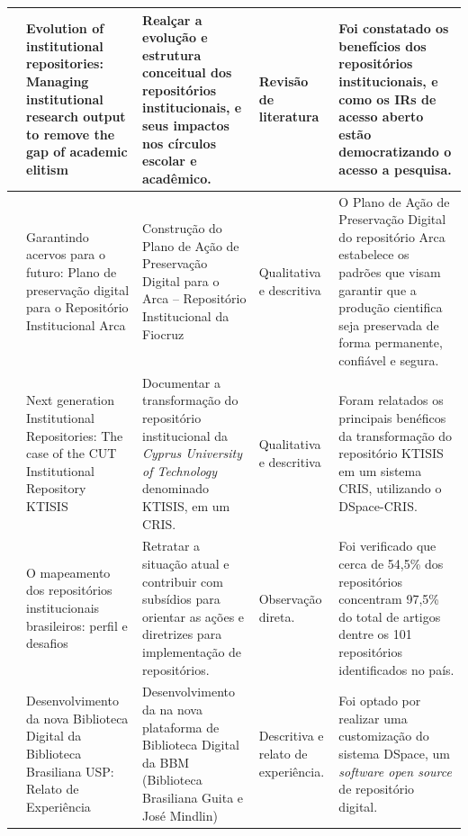 \begin{landscape}
\begin{table}[H]
{\begin{tabular}{|p{5cm}|p{12cm}|p{12cm}|p{4cm}|p{13cm}|}
                \cite{2021:Bashir}           & Evolution of institutional repositories: Managing institutional research output to remove the gap of academic elitism                     & Realçar a evolução e estrutura conceitual dos repositórios institucionais, e seus impactos nos círculos escolar e acadêmico.                                & Revisão de literatura               & Foi constatado os benefícios dos repositórios institucionais, e como os IRs de acesso aberto estão democratizando o acesso a pesquisa.                                                       \\ \hline
                \cite{2020:Queiroz}          & Garantindo acervos para o futuro: Plano de preservação digital para o Repositório Institucional Arca                                      & Construção do Plano de Ação de Preservação Digital para o Arca – Repositório Institucional da Fiocruz                                                       & Qualitativa e descritiva            & O Plano de Ação de Preservação Digital do repositório Arca estabelece os padrões que visam garantir que a produção cientifica seja preservada de forma permanente, confiável e segura.       \\ \hline
                \cite{2019:Zervas}           & Next generation Institutional Repositories: The case of the CUT Institutional Repository KTISIS                                           & Documentar a transformação do repositório institucional da \emph{Cyprus University of Technology} denominado KTISIS, em um CRIS.                            & Qualitativa e descritiva            & Foram relatados os principais benéficos da transformação do repositório KTISIS em um sistema CRIS, utilizando o DSpace-CRIS.                                                                 \\ \hline
                \cite{2019:Weitzel}          & O mapeamento dos repositórios institucionais brasileiros: perfil e desafios                                                               & Retratar a situação atual e contribuir com subsídios para orientar as ações e diretrizes para implementação de repositórios.                                & Observação direta.                  & Foi verificado que cerca de 54,5\% dos repositórios concentram 97,5\% do total de artigos dentre os 101 repositórios identificados no país.                                                  \\ \hline
                \cite{2019:RodrigoMoreira}   & Desenvolvimento da nova Biblioteca Digital da Biblioteca Brasiliana USP: Relato de Experiência                                            & Desenvolvimento da na nova plataforma de Biblioteca Digital da BBM (Biblioteca Brasiliana Guita e José Mindlin)                                             & Descritiva e relato de experiência. & Foi optado por realizar uma customização do sistema DSpace, um \emph{software open source} de repositório digital.                                                                           \\ \hline

\end{tabular}}
\end{table}
\end{landscape}
